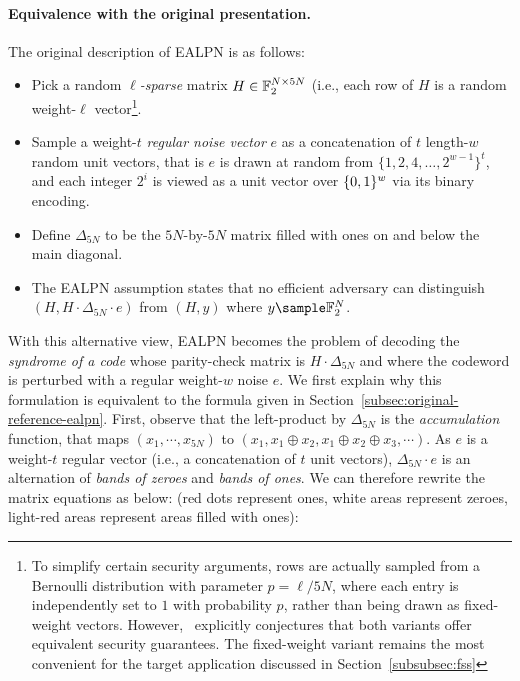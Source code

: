 \paragraph{Equivalence with the original presentation.} The original description of {\sf EALPN} is as follows:
\begin{itemize}
	\item Pick a random \emph{$\ell$-sparse} matrix $H \in \mathbb{F}_2^{N\times 5N}$ (i.e., each row of $H$ is a random weight-$\ell$ vector\footnote{To simplify certain security arguments, rows are actually sampled from a Bernoulli distribution with parameter $p = \ell / 5N$, where each entry is independently set to $1$ with probability $p$, rather than being drawn as fixed-weight vectors. However,~\cite[Section~3.4]{C:BCGIKR22} explicitly conjectures that both variants offer equivalent security guarantees. The fixed-weight variant remains the most convenient for the target application discussed in Section~\ref{subsubsec:fss}}.
	\item Sample a weight-$t$ \emph{regular noise vector} $e$ as a concatenation of $t$ length-$w$ random unit vectors, that is $e$ is drawn at random from $\{1,2,4,\ldots,2^{w-1}\}^t$, and each integer $2^i$ is viewed as a unit vector over $\{0,1\}^w$ via its binary encoding. 
	\item Define $\Delta_{5N}$ to be the $5N$-by-$5N$ matrix filled with ones on and below the main diagonal.
	\item The {\sf EALPN} assumption states that no efficient adversary can distinguish $(H, H\cdot \Delta_{5N} \cdot e)$ from $(H, y)$ where $y \sample \F_2^{N}$.
\end{itemize}

With this alternative view, {\sf EALPN} becomes the problem of decoding the \emph{syndrome of a code} whose parity-check matrix is $H\cdot \Delta_{5N}$ and where the codeword is perturbed with a regular weight-$w$ noise $e$. We first explain why this formulation is equivalent to the formula given in Section~\ref{subsec:original-reference-ealpn}. First, observe that the left-product by $\Delta_{5N}$ is the \emph{accumulation} function, that maps $(x_1, \cdots, x_{5N})$ to $(x_1, x_1\oplus x_2, x_1\oplus x_2 \oplus x_3, \cdots)$. As $e$ is a weight-$t$ regular vector (i.e., a concatenation of $t$ unit vectors), $\Delta_{5N}\cdot e$ is an alternation of \emph{bands of zeroes} and \emph{bands of ones}. We can therefore rewrite the matrix equations as below: (red dots represent ones, white areas represent zeroes, light-red areas represent areas filled with ones):



